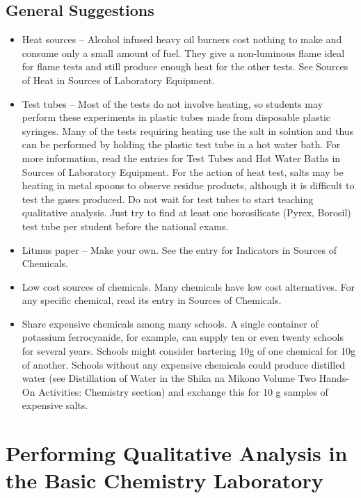 \subsection{General Suggestions}
\begin{itemize}
\item{Heat sources – Alcohol infused heavy oil burners 
cost nothing to make and consume only a small amount of fuel. 
They give a non-luminous flame ideal for flame tests 
and still produce enough heat for the other tests. 
See Sources of Heat in Sources of Laboratory Equipment.}
\item{Test tubes – Most of the tests do not involve heating, 
so students may perform these experiments in plastic tubes 
made from disposable plastic syringes. 
Many of the tests requiring heating use the salt in solution 
and thus can be performed 
by holding the plastic test tube in a hot water bath. 
For more information, 
read the entries for Test Tubes 
and Hot Water Baths in Sources of Laboratory Equipment.
For the action of heat test, 
salts may be heating in metal spoons to observe residue products, 
although it is difficult to test the gases produced. 
Do not wait for test tubes to start teaching qualitative analysis. 
Just try to find at least one borosilicate (Pyrex, 
Borosil) test tube per student before the national exams.}
\item{Litmus paper – Make your own. 
See the entry for Indicators in Sources of Chemicals.}
\item{Low cost sources of chemicals. 
Many chemicals have low cost alternatives. 
For any specific chemical, 
read its entry in Sources of Chemicals.}
\item{Share expensive chemicals among many schools. 
A single container of potassium ferrocyanide, 
for example, 
can supply ten or even twenty schools for several years. 
Schools might consider bartering 10g of one chemical for 10g of another. 
Schools without any expensive chemicals could produce distilled water (see Distillation of Water in the Shika na Mikono Volume Two Hands-On Activities: Chemistry section) and exchange this for 10 g samples of expensive salts.}
\end{itemize} 
 
\section{Performing Qualitative Analysis in the Basic Chemistry Laboratory}

